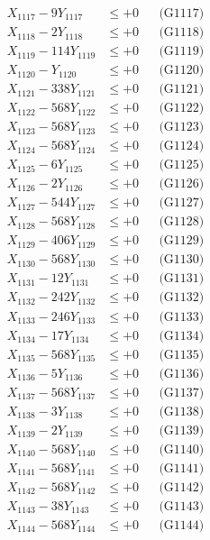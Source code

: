 \documentclass[a4paper,10pt]{article}
\begin{document}
{\begin{align}
X_{1117} - 9Y_{1117} &\leq +0 && \text{(G1117)} \\
X_{1118} - 2Y_{1118} &\leq +0 && \text{(G1118)} \\
X_{1119} - 114Y_{1119} &\leq +0 && \text{(G1119)} \\
X_{1120} - Y_{1120} &\leq +0 && \text{(G1120)} \\
\allowbreak
X_{1121} - 338Y_{1121} &\leq +0 && \text{(G1121)} \\
X_{1122} - 568Y_{1122} &\leq +0 && \text{(G1122)} \\
X_{1123} - 568Y_{1123} &\leq +0 && \text{(G1123)} \\
X_{1124} - 568Y_{1124} &\leq +0 && \text{(G1124)} \\
X_{1125} - 6Y_{1125} &\leq +0 && \text{(G1125)} \\
X_{1126} - 2Y_{1126} &\leq +0 && \text{(G1126)} \\
X_{1127} - 544Y_{1127} &\leq +0 && \text{(G1127)} \\
X_{1128} - 568Y_{1128} &\leq +0 && \text{(G1128)} \\
X_{1129} - 406Y_{1129} &\leq +0 && \text{(G1129)} \\
X_{1130} - 568Y_{1130} &\leq +0 && \text{(G1130)} \\
\allowbreak
X_{1131} - 12Y_{1131} &\leq +0 && \text{(G1131)} \\
X_{1132} - 242Y_{1132} &\leq +0 && \text{(G1132)} \\
X_{1133} - 246Y_{1133} &\leq +0 && \text{(G1133)} \\
X_{1134} - 17Y_{1134} &\leq +0 && \text{(G1134)} \\
X_{1135} - 568Y_{1135} &\leq +0 && \text{(G1135)} \\
X_{1136} - 5Y_{1136} &\leq +0 && \text{(G1136)} \\
X_{1137} - 568Y_{1137} &\leq +0 && \text{(G1137)} \\
X_{1138} - 3Y_{1138} &\leq +0 && \text{(G1138)} \\
X_{1139} - 2Y_{1139} &\leq +0 && \text{(G1139)} \\
X_{1140} - 568Y_{1140} &\leq +0 && \text{(G1140)} \\
\allowbreak
X_{1141} - 568Y_{1141} &\leq +0 && \text{(G1141)} \\
X_{1142} - 568Y_{1142} &\leq +0 && \text{(G1142)} \\
X_{1143} - 38Y_{1143} &\leq +0 && \text{(G1143)} \\
X_{1144} - 568Y_{1144} &\leq +0 && \text{(G1144)} \\

\end{align}}
\end{document}
